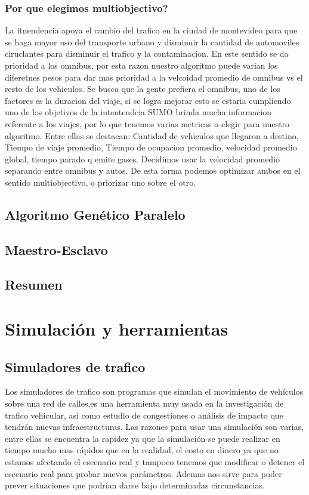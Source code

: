 \subsubsection{Por que elegimos multiobjectivo?}
La itnendencia apoya el cambio del trafico en la ciudad de montevideo para que se haga mayor uso del transporte urbano y disminuir la cantidad de automoviles ciruclantes para disminuir el trafico y la contaminacion. En este sentido se da prioridad a los omnibus, por esta razon nuestro algoritmo puede varian los diferetnes pesos para dar mas prioridad a la velcoidad promedio de omnibus vs el resto de los vehiculos. 
Se busca que la gente prefiera el omnibus, uno de los factores es la duracion del viaje, si se logra mejorar esto se estaria cumpliendo uno de los objetivos de la intentendcia
SUMO brinda mucha informacion referente a los viajes, por lo que tenemos varias metricas a elegir para nuestro algoritmo. Entre ellas se destacan: Cantidad de vehiculos que llegaron a destino, Tiempo de viaje promedio, Tiempo de ocupacion promedio, velocidad promedio global, tiempo parado q emite gases. Decidimos usar la velocidad promedio separando entre omnibus y autos. De esta forma podemos optimizar ambos en el sentido multiobjectivo, o priorizar uno sobre el otro.


\subsection{Algoritmo Genético Paralelo}
\subsection{Maestro-Esclavo}
\subsection{Resumen}




\section{Simulación y herramientas}

\subsection{Simuladores de trafico}
Los simuladores de trafico son programas que simulan el movimiento de vehículos sobre una red de calles,es una herramienta muy usada en la investigación de trafico vehicular, así como estudio de congestiones o análisis de impacto que tendrán nuevas infraestructuras.  Las razones para usar una simulación son varias, entre ellas se encuentra  la rapidez  ya que la simulación se puede realizar en tiempo mucho mas rápidos que en la realidad, el costo en dinero ya que no estamos afectando el escenario real  y tampoco tenemos que modificar o detener el escenario real para probar nuevos parámetros. Ademas nos sirve para poder prever situaciones que podrían darse bajo determinadas circunstancias.

